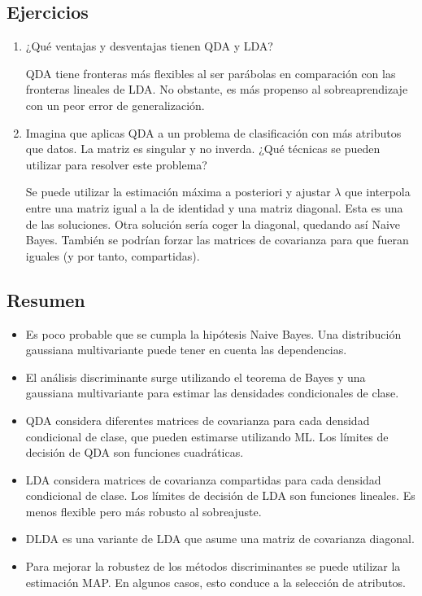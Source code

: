 \subsection{Ejercicios}
\begin{enumerate}
\item ¿Qué ventajas y desventajas tienen QDA y LDA?

QDA tiene fronteras más flexibles al ser parábolas en comparación con las fronteras lineales de LDA. No obstante, es más propenso al sobreaprendizaje con un peor error de generalización.

\item Imagina que aplicas QDA a un problema de clasificación con más atributos que datos. La matriz es singular y no inverda. ¿Qué técnicas se pueden utilizar para resolver este problema?

Se puede utilizar la estimación máxima a posteriori y ajustar $\lambda$ que interpola entre una matriz igual a la de identidad y una matriz diagonal. Esta es una de las soluciones. Otra solución sería coger la diagonal, quedando así Naive Bayes. También se podrían forzar las matrices de covarianza para que fueran iguales (y por tanto, compartidas).
\end{enumerate}

\subsection{Resumen}
\begin{itemize}
\item Es poco probable que se cumpla la hipótesis Naive Bayes. Una distribución gaussiana multivariante puede tener en cuenta las dependencias.
\item El análisis discriminante surge utilizando el teorema de Bayes y una gaussiana multivariante para estimar las densidades condicionales de clase.
\item QDA considera diferentes matrices de covarianza para cada densidad condicional de clase, que pueden estimarse utilizando ML. Los límites de decisión de QDA son funciones cuadráticas.
\item LDA considera matrices de covarianza compartidas para cada densidad condicional de clase. Los límites de decisión de LDA son funciones lineales. Es menos flexible pero más robusto al sobreajuste.
\item DLDA es una variante de LDA que asume una matriz de covarianza diagonal.
\item Para mejorar la robustez de los métodos discriminantes se puede utilizar la estimación MAP. En algunos casos, esto conduce a la selección de atributos.
\end{itemize}

